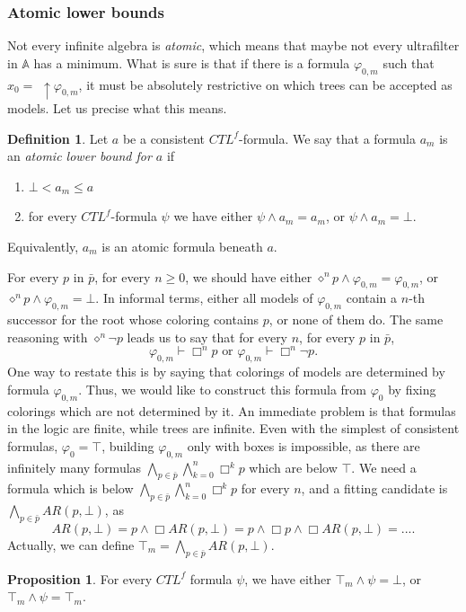 \documentclass[11pt]{article}
\newcommand{\A}{{\mathbb{A}}}
\theoremstyle{definition}
\newtheorem*{definition}{Definition}
\newtheorem*{proposition}{Proposition}
\begin{document}
\subsubsection*{Atomic lower bounds}
Not every infinite algebra is \emph{atomic}, which means that maybe not every ultrafilter in $\A$ has a minimum.
What is sure is that if there is a formula $\varphi_{0,m}$ such that $x_0 =$ $\uparrow\varphi_{0,m}$,
it must be absolutely restrictive on which trees can be accepted as models. Let us precise what this means. 
\begin{definition}\label{phi_m}
    Let $a$ be a consistent $CTL^f$-formula. We say that a formula $a_m$ is an \emph{atomic lower bound for $a$} if 
    \begin{enumerate}
        \item $\bot<a_m\leq a$
        \item for every $CTL^f$-formula $\psi$ we have either $\psi\wedge a_m=a_m$, or $\psi\wedge a_m=\bot$.
    \end{enumerate}
    Equivalently, $a_m$ is an atomic formula beneath $a$.
\end{definition}
For every $p$ in $\bar{p}$, for every $n \geq 0$, we should have either $\diamond^np \wedge \varphi_{0,m} = \varphi_{0,m}$, 
or $\diamond^np \wedge \varphi_{0,m} =\bot$. In informal terms, either all models of $\varphi_{0,m}$ contain a $n$-th successor 
for the root whose coloring contains $p$, or none of them do. The same reasoning with $\diamond^n\neg p$ leads us to say that for every $n$, 
for every $p$ in $\bar{p}$, \[\varphi_{0,m}\vdash\Box^n p\mbox{ or } \varphi_{0,m}\vdash\Box^n\neg p.\]
One way to restate this is by saying that colorings of models are determined by formula $\varphi_{0,m}$. Thus, we would like to construct this formula from $\varphi_0$ by fixing colorings which are not determined by it. An immediate problem is that formulas in the logic are finite, while trees are infinite. Even with the simplest of consistent formulas, $\varphi_0 = \top$, building $\varphi_{0,m}$ only with boxes is impossible, as there are infinitely many formulas $\bigwedge_{p\in\bar{p}}\bigwedge_{k=0}^n\Box^k p$ which are below $\top$. We need a formula which is below $\bigwedge_{p\in\bar{p}}\bigwedge_{k=0}^n\Box^k p$ for every $n$, and a fitting candidate is $\bigwedge_{p\in\bar{p}}AR(p,\bot)$, as \[AR(p,\bot)=p\wedge\Box AR(p,\bot)=p\wedge\Box p\wedge \Box AR(p,\bot)=... .\] Actually, we can define $\top_m=\bigwedge_{p\in\bar{p}}AR(p,\bot)$. 
\begin{proposition}\label{top_m}
    For every $CTL^f$ formula $\psi$, we have either $\top_m\wedge\psi=\bot$, or $\top_m\wedge\psi=\top_m$.
\end{proposition}
\end{document}
